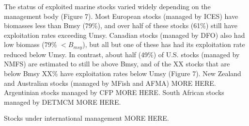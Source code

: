 The status of exploited marine stocks varied widely depending on the
management body (Figure 7). Most European stocks (managed by ICES)
have biomasses less than Bmsy (79\%), and over half of these stocks (61\%)
still have exploitation rates exceeding Umsy. Canadian stocks
(managed by DFO) also had low biomass (79\% $< B_{msy}$), but all but one
of these has had its exploitation rate reduced below Umsy. In
contrast, about half (49\%) of U.S. stocks (managed by NMFS) are
estimated to still be above Bmsy, and of the XX stocks that are below
Bmsy XX\% have exploitation rates below Umsy (Figure 7). New Zealand
and Australian stocks (managed by MFish and AFMA) MORE HERE. Argentinian stocks managed by CFP MORE HERE. South African stocks managed by DETMCM MORE HERE. 

Stocks under international management MORE HERE.




 

